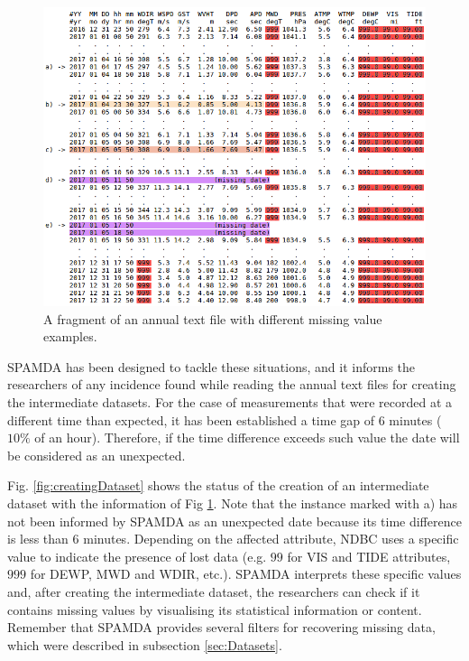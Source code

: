\documentclass[energies,article,submit,moreauthors,pdftex]{Definitions/mdpi}
\begin{document}
		\begin{figure}[ht!]
			\centering
			\includegraphics[scale=0.45]{figures/FigureMeasurements.png}
			\caption{A fragment of an annual text file with different missing value examples.}
			\label{fig:measurements}
		\end{figure}
		
		SPAMDA has been designed to tackle these situations, and it informs the researchers of any incidence found while reading the annual text files for creating the intermediate datasets. For the case of measurements that were recorded at a different time than expected, it has been established a time gap of 6 minutes ($10\%$ of an hour). Therefore, if the time difference exceeds such value the date will be considered as an unexpected.
		
		Fig. \ref{fig:creatingDataset} shows the status of the creation of an intermediate dataset with the information of Fig \ref{fig:measurements}. Note that the instance marked with a) has not been informed by SPAMDA as an unexpected date because its time difference is less than $6$ minutes. Depending on the affected attribute, NDBC uses a specific value \cite{NOAA_3} to indicate the presence of lost data (e.g. $99$ for VIS and TIDE attributes, $999$ for DEWP, MWD and WDIR, etc.). SPAMDA interprets these specific values and, after creating the intermediate dataset, the researchers can check if it contains missing values by visualising its statistical information or content. Remember that SPAMDA provides several filters for recovering missing data, which were described in subsection \ref{sec:Datasets}.
		
\end{document}
